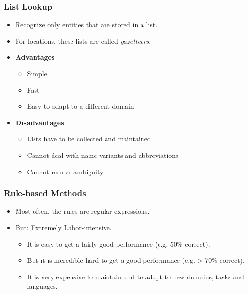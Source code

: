             \subsubsection{List Lookup} %
                \begin{itemize}
                	\item Recognize only entities that are stored in a list.
                	\item For locations, these lists are called \textit{gazetteers}.
                	\item \textbf{Advantages}
                		\begin{itemize}
                			\item Simple
                			\item Fast
                			\item Easy to adapt to a different domain
                		\end{itemize}
                	\item \textbf{Disadvantages}
                		\begin{itemize}
                			\item Lists have to be collected and maintained
                			\item Cannot deal with name variants and abbreviations
                			\item Cannot resolve ambiguity
                		\end{itemize}
                \end{itemize}

            \subsubsection{Rule-based Methods} %
                \begin{itemize}
                	\item Most often, the rules are regular expressions.
                	\item But: Extremely Labor-intensive.
                		\begin{itemize}
                			\item It is easy to get a fairly good performance (e.g. 50\% correct).
                			\item But it is incredible hard to get a good performance (e.g. > 70\% correct).
                			\item It is very expensive to maintain and to adapt to new domains, tasks and languages.
                		\end{itemize}
                \end{itemize}
